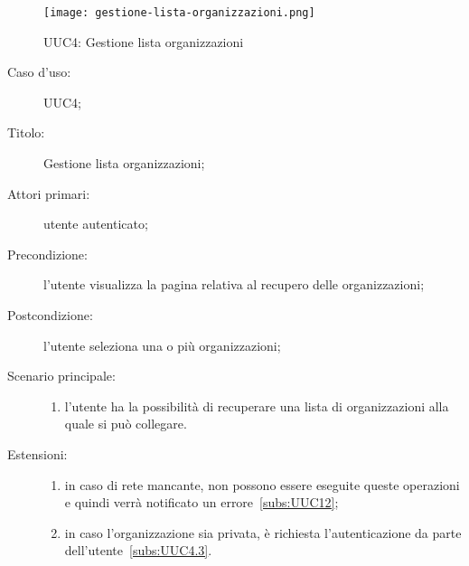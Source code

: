 \documentclass[../../../analisi-dei-requisiti.tex]{subfiles}
\begin{document}
\begin{figure}[H]
  \centering
  \texttt{[image: gestione-lista-organizzazioni.png]}
  \caption{UUC4: Gestione lista organizzazioni}%
  \label{fig:uuc4}
\end{figure}

\begin{description}
  \item[Caso d’uso:] UUC4;
  \item[Titolo:] Gestione lista organizzazioni;
  \item[Attori primari:] utente autenticato;
  \item[Precondizione:] l'utente visualizza la pagina relativa al recupero delle organizzazioni;
  \item[Postcondizione:] l'utente seleziona una o più organizzazioni;
  \item[Scenario principale:]
        \begin{enumerate}
          \item l'utente ha la possibilità di recuperare una lista di organizzazioni alla quale si può collegare.
        \end{enumerate}
  \item[Estensioni:]
        \begin{enumerate}
          \item in caso di rete mancante, non possono essere eseguite queste operazioni e quindi verrà notificato un errore~\ref{subs:UUC12};
          \item in caso l'organizzazione sia privata, è richiesta l'autenticazione da parte dell'utente~\ref{subs:UUC4.3}.
        \end{enumerate}
\end{description}
\end{document}
